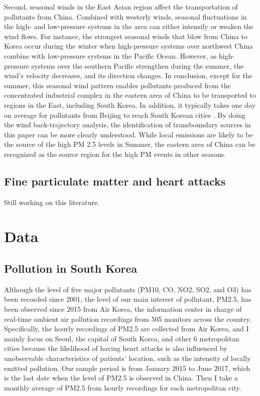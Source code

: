 \documentclass{article}
\begin{document}
Second, seasonal winds in the East Asian region affect the transportation of pollutants from China. Combined with westerly winds, seasonal fluctuations in the high- and low-pressure systems in the area can either intensify or weaken the wind flows. For instance, the strongest seasonal winds that blow from China to Korea occur during the winter when high-pressure systems over northwest China combine with low-pressure systems in the Pacific Ocean. However, as high-pressure systems over the southern Pacific strengthen during the summer, the wind's velocity decreases, and its direction changes. In conclusion, except for the summer, this seasonal wind pattern enables pollutants produced from the concentrated industrial complex in the eastern area of China to be transported to regions in the East, including South Korea. In addition, it typically takes one day on average for pollutants from Beijing to reach South Korean cities \parencite{lee2011high}. By doing the wind back-trajectory analysis, the identification of transboundary sources in this paper can be more clearly understood. While local emissions are likely to be the source of the high PM 2.5 levels in Summer, the eastern area of China can be recognized as the source region for the high PM events in other seasons.

\subsection{Fine particulate matter and heart attacks}
Still working on this literature.

\section{Data}
\subsection{Pollution in South Korea}
Although the level of five major pollutants (PM10, CO, NO2, SO2, and O3) has been recorded since 2001, the level of our main interest of pollutant, PM2.5, has been observed since 2015 from Air Korea, the information center in charge of real-time ambient air pollution recordings from 505 monitors across the country. Specifically, the hourly recordings of PM2.5 are collected from Air Korea, and I mainly focus on Seoul, the capital of South Korea, and other 6 metropolitan cities because the likelihood of having heart attacks is also influenced by unobservable characteristics of patients' location, such as the intensity of locally emitted pollution. Our sample period is from January 2015 to June 2017, which is the last date when the level of PM2.5 is observed in China. Then I take a monthly average of PM2.5 from hourly recordings for each metropolitan city. 
\end{document}
